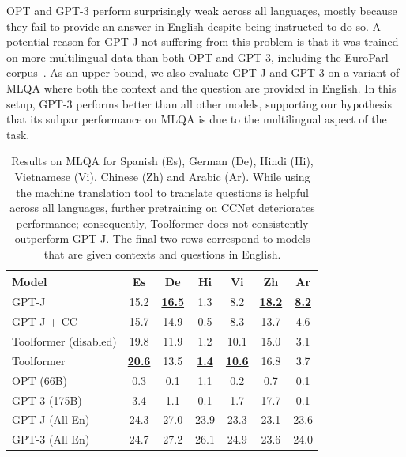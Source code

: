 \documentclass[11pt]{article}
\newcommand{\ours}[0]{Toolformer}
\begin{document}
\begin{CJK*}{UTF8}{gbsn}
OPT and GPT-3 perform surprisingly weak across all languages, mostly because they fail to provide an answer in English despite being instructed to do so. A potential reason for GPT-J not suffering from this problem is that it was trained on more multilingual data than both OPT and GPT-3, including the EuroParl corpus~\citep{koehn2005europarl, gao2020pile}. As an upper bound, we also evaluate GPT-J and GPT-3 on a variant of MLQA where both the context and the question are provided in English. In this setup, GPT-3 performs better than all other models, supporting our hypothesis that its subpar performance on MLQA is due to the multilingual aspect of the task. 

\begin{table}
    \centering
    \small
    \setlength{\tabcolsep}{3pt}
    \begin{tabularx}{\linewidth}{Xcccccc}
        \toprule
        \textbf{Model} & \textbf{Es} & \textbf{De} & \textbf{Hi}  & \textbf{Vi} & \textbf{Zh}  & \textbf{Ar} \\
        \midrule
         GPT-J & 15.2 & \textbf{\underline{16.5}} & \phantom{0}1.3 & \phantom{0}8.2 & \textbf{\underline{18.2}} & \phantom{0}\textbf{\underline{8.2}} \\         
         GPT-J + CC & 15.7 & 14.9 & \phantom{0}0.5 & \phantom{0}8.3 & 13.7 & \phantom{0}4.6 \\             
         \ours{} (disabled) & 19.8 & 11.9 & \phantom{0}1.2 & 10.1 & 15.0 & \phantom{0}3.1 \\     
         \ours{} & \textbf{\underline{20.6}} & 13.5 & \phantom{0}\textbf{\underline{1.4}} & \textbf{\underline{10.6}} & 16.8 & \phantom{0}3.7  \\     
         \midrule  
         OPT (66B) & \phantom{0}0.3 & \phantom{0}0.1 & \phantom{0}1.1 & \phantom{0}0.2 & \phantom{0}0.7 & \phantom{0}0.1 \\     
         GPT-3 (175B)  & \phantom{0}3.4 & \phantom{0}1.1 & \phantom{0}0.1 & \phantom{0}1.7 & 17.7 & \phantom{0}0.1 \\     
         \midrule  
         GPT-J (All En) & 24.3 & 27.0 & 23.9 & 23.3 & 23.1 & 23.6 \\     
         GPT-3 (All En)  & 24.7 & 27.2 & 26.1 & 24.9 & 23.6 & 24.0 \\     
         \bottomrule
    \end{tabularx}
    \caption{Results on MLQA for Spanish (Es), German (De), Hindi (Hi), Vietnamese (Vi), Chinese (Zh) and Arabic (Ar). 
    While using the machine translation tool to translate questions is helpful across all languages, further pretraining on CCNet deteriorates performance; consequently, \ours{} does not consistently outperform GPT-J. The final two rows correspond to models that are given contexts and questions in English.}
    \label{tab:mt_results_percentage}
\end{table}



\end{CJK*}
\end{document}
